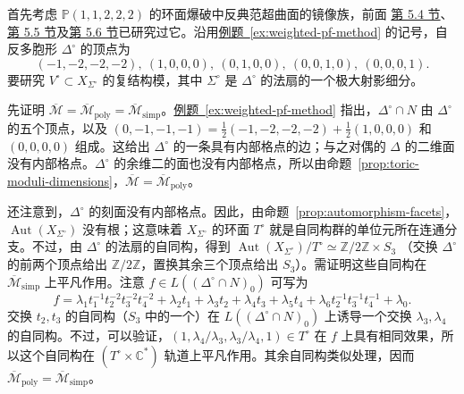 \begin{example}\label{ex:weighted-complex-moduli}
首先考虑 $\mathbb P(1,1,2,2,2)$ 的环面爆破中反典范超曲面的镜像族，前面
\hyperref[sec:hodge-examples]{第 5.4 节}、\hyperref[sec:hypergeometric]{第 5.5 节}及\hyperref[sec:yukawa-couplings]{第 5.6 节}已研究过它。沿用\hyperref[ex:weighted-pf-method]{例题~\ref*{ex:weighted-pf-method}} 的记号，自反多胞形 $\Delta^\circ$ 的顶点为
\[
(-1,-2,-2,-2),\ (1,0,0,0),\ (0,1,0,0),\ (0,0,1,0),\ (0,0,0,1).
\]
要研究 $V^\circ\subset X_{\Sigma^\circ}$ 的复结构模，其中 $\Sigma^\circ$ 是 $\Delta^\circ$ 的法扇的一个极大射影细分。

先证明 $\overline{\mathcal M}=\overline{\mathcal M}_{\mathrm{poly}}=\overline{\mathcal M}_{\mathrm{simp}}$。\hyperref[ex:weighted-pf-method]{例题~\ref*{ex:weighted-pf-method}} 指出，$\Delta^\circ\cap N$ 由 $\Delta^\circ$ 的五个顶点，以及
$(0,-1,-1,-1)=\frac12(-1,-2,-2,-2)+\frac12(1,0,0,0)$ 和 $(0,0,0,0)$ 组成。这给出 $\Delta^\circ$ 的一条具有内部格点的边；与之对偶的 $\Delta$ 的二维面没有内部格点。$\Delta^\circ$ 的余维二的面也没有内部格点，所以由命题~\ref{prop:toric-moduli-dimensions}，$\overline{\mathcal M}=\overline{\mathcal M}_{\mathrm{poly}}$。

还注意到，$\Delta^\circ$ 的刻面没有内部格点。因此，由命题~\ref{prop:automorphism-facets}，$\operatorname{Aut}(X_{\Sigma^\circ})$ 没有根；这意味着 $X_{\Sigma^\circ}$ 的环面 $T^\circ$ 就是自同构群的单位元所在连通分支。不过，由 $\Delta^\circ$ 的法扇的自同构，得到
$\operatorname{Aut}(X_{\Sigma^\circ})/T^\circ\simeq\mathbb Z/2\mathbb Z\times S_3$
（交换 $\Delta^\circ$ 的前两个顶点给出 $\mathbb Z/2\mathbb Z$，置换其余三个顶点给出 $S_3$）。需证明这些自同构在 $\overline{\mathcal M}_{\mathrm{simp}}$ 上平凡作用。注意 $f\in L((\Delta^\circ\cap N)_0)$ 可写为
\[
f=\lambda_1t_1^{-1}t_2^{-2}t_3^{-2}t_4^{-2}+\lambda_2t_1
+\lambda_3t_2+\lambda_4t_3+\lambda_5t_4
+\lambda_6t_2^{-1}t_3^{-1}t_4^{-1}+\lambda_0.
\]
交换 $t_2,t_3$ 的自同构（$S_3$ 中的一个）在 $L((\Delta^\circ\cap N)_0)$ 上诱导一个交换 $\lambda_3,\lambda_4$ 的自同构。不过，可以验证，$(1,\lambda_4/\lambda_3,\lambda_3/\lambda_4,1)\in T^\circ$ 在 $f$ 上具有相同效果，所以这个自同构在 $(T^\circ\times\mathbb C^*)$ 轨道上平凡作用。其余自同构类似处理，因而 $\overline{\mathcal M}_{\mathrm{poly}}=\overline{\mathcal M}_{\mathrm{simp}}$。


\end{example}
